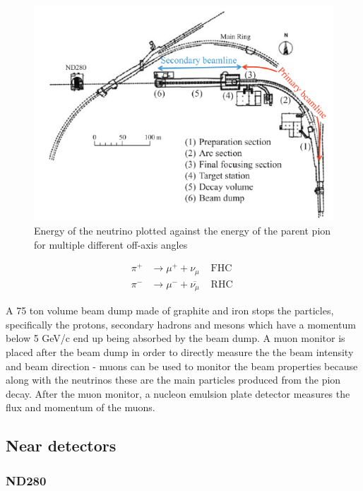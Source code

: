 \begin{figure}
    \includegraphics[width=\textwidth]{Figures/nubeamline.png}
    \caption{Energy of the neutrino plotted against the energy of the parent pion for multiple different off-axis angles}
        \label{fig:nubeamline}
\end{figure}

\begin{equation}
\begin{array}{lll}
\pi^{+} & \longrightarrow \mu^{+}+\nu_{\mu} & \text { FHC } \\
\pi^{-} & \longrightarrow \mu^{-}+\overline{\nu_{\mu}} & \text { RHC }
\end{array}
\label{eq:nubeam}
\end{equation}

A 75 ton volume beam dump made of graphite and iron stops the particles, specifically the protons, secondary hadrons and mesons which have a momentum below 5 GeV/c end up being absorbed by the beam dump. A muon monitor is placed after the beam dump in order to directly measure the the beam intensity and beam direction - muons can be used to monitor the beam properties because along with the neutrinos these are the main particles produced from the pion decay. After the muon monitor, a nucleon emulsion plate detector measures the flux and momentum of the muons. 

\subsection{Near detectors}

\subsubsection{ND280}

